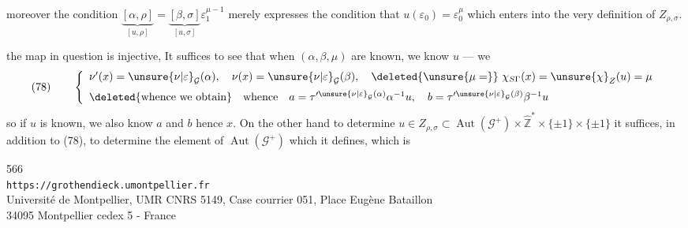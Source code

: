 
 moreover the condition
$\underbrace{[\alpha,\rho]}_{[u,\rho]}=\underbrace{[\beta,\sigma]}_{[u,\sigma]}\varepsilon_{1}^{\mu-1}$ 
merely expresses the condition that $u(\varepsilon_{0})=\varepsilon_{0}^{\mu}$ which enters into the very definition of $Z_{\rho,\sigma}$.

  the map in question  is injective,  It suffices to see that when $(\alpha,\beta,\mu)$ are known, we know $u$ ---  we  
\[
\text{(78)}\qquad
\left\{\begin{array}{l}
\nu'(x)=\unsure{\nu|\varepsilon}_{\mathcal{G}}(\alpha),\quad
\nu(x)=\unsure{\nu|\varepsilon}_{\mathcal{G}}(\beta),\quad
\deleted{\unsure{\mu=}}\ \chi_{S\Gamma}(x)=\unsure{\chi}_{Z}(u)=\mu\\[0.6em]
\deleted{\text{whence we obtain}}\quad\text{whence}\quad
a=\tau'^{\unsure{\nu|\varepsilon}_{\mathcal{G}}(\alpha)}\alpha^{-1}u,\quad
b=\tau'^{\unsure{\nu|\varepsilon}_{\mathcal{G}}(\beta)}\beta^{-1}u
\end{array}\right.
\]
 so if $u$ is known, we also know $a$ and $b$ hence $x$. On the other hand to determine  $u\in Z_{\rho,\sigma}\subset\operatorname{Aut}(\mathcal{G}^{+})\times\widehat{\mathbb Z}^{*}\times\{\pm1\}\times\{\pm1\}$ it suffices, in addition to (78), to determine   the element of $\operatorname{Aut}(\mathcal{G}^{+})$ which it defines, which is


{\small
\begin{center}
566\\
\texttt{https://grothendieck.umontpellier.fr}\\
Université de Montpellier, UMR CNRS 5149, Case courrier 051, Place Eugène Bataillon\\
34095 Montpellier cedex 5 - France
\end{center}
}
